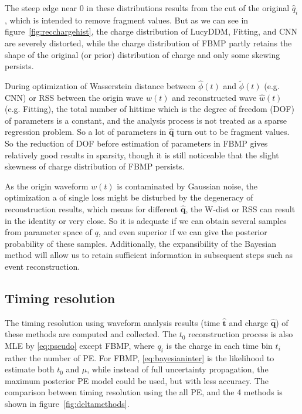 The steep edge near 0 in these distributions results from the cut of the original $\hat{q}_i$, which is intended to remove fragment values. But as we can see in figure~\ref{fig:recchargehist}, the charge distribution of LucyDDM, Fitting, and CNN are severely distorted, while the charge distribution of FBMP partly retains the shape of the original (or prior) distribution of charge and only some skewing persists. 

During optimization of Wasserstein distance between $\hat{\phi}(t)$ and $\tilde{\phi}(t)$ (e.g. CNN) or RSS between the origin wave $w(t)$ and reconstructed wave $\hat{w}(t)$ (e.g. Fitting), the total number of hittime which is the degree of freedom (DOF) of parameters is a constant, and the analysis process is not treated as a sparse regression problem. So a lot of parameters in $\bm{\hat{q}}$ turn out to be fragment values. So the reduction of DOF before estimation of parameters in FBMP gives relatively good results in sparsity, though it is still noticeable that the slight skewness of charge distribution of FBMP persists. 


As the origin waveform $w(t)$ is contaminated by Gaussian noise, the optimization a of single loss might be disturbed by the degeneracy of reconstruction results, which means for different $\bm{\hat{q}}$, the W-dist or RSS can result in the identity or very close. So it is adequate if we can obtain several samples from parameter space of $q$, and even superior if we can give the posterior probability of these samples. Additionally, the expansibility of the Bayesian method will allow us to retain sufficient information in subsequent steps such as event reconstruction. 

\subsection{Timing resolution}
\label{subsec:timeresolution}


The timing resolution using waveform analysis results (time $\bm{\hat{t}}$ and charge $\bm{\hat{q}}$) of these methods are computed and collected. The $t_{0}$ reconstruction process is also MLE by \eqref{eq:pseudo} except FBMP, where $q_{i}$ is the charge in each time bin $t_{i}$ rather the number of PE. For FBMP, \eqref{eq:bayesianinter} is the likelihood to estimate both $t_{0}$ and $\mu$, while instead of full uncertainty propagation, the maximum posterior PE model could be used, but with less accuracy. The comparison between timing resolution using the all PE, and the 4 methods is shown in figure~\ref{fig:deltamethods}. 

